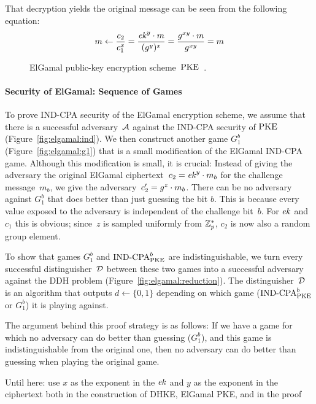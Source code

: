 That decryption yields the original message can be seen from the following equation:
\[m\gets\frac{c_2}{c_1^x}=\frac{\mathit{ek}^y\cdot m}{(g^y)^x}=\frac{g^{xy}\cdot m}{g^{xy}}=m\]
\begin{figure}[!ht]
    \centering
    \nicoresetlinenr%
    \fbox{%
        \scalebox{\codescalefactor}{%
        }%
    }
    \caption{%
        ElGamal public-key encryption scheme~$\mathrm{PKE}$~\cite{ElGamal85}.
    }
    \label{fig:pke:elgamal:const}
\end{figure}

\paragraph{Security of ElGamal: Sequence of Games}
To prove IND-CPA security of the ElGamal encryption scheme, we assume that there is a successful adversary~$\mathcal{A}$ against the IND-CPA security of $\mathrm{PKE}$ (Figure~\ref{fig:elgamal:ind}).
We then construct another game $G_1^b$ (Figure~\ref{fig:elgamal:g1}) that is a small modification of the ElGamal IND-CPA game.
Although this modification is small, it is crucial:
Instead of giving the adversary the original ElGamal ciphertext~$c_2=\mathit{ek}^y\cdot m_b$ for the challenge message~$m_b$, we give the adversary~$c_2'=g^z\cdot m_b$.
There can be no adversary against $G_1^b$ that does better than just guessing the bit $b$.
This is because every value exposed to the adversary is independent of the challenge bit~$b$.
For $\mathit{ek}$ and $c_1$ this is obvious; since~$z$ is sampled uniformly from $\mathbb{Z}_p^*$, $c_2$ is now also a random group element.

To show that games $G_1^b$ and ${\mathrm{IND}\text{-}\mathrm{CPA}}_{\mathrm{PKE}}^b$ are indistinguishable, we turn every successful distinguisher~$\mathcal{D}$ between these two games into a successful adversary against the DDH problem (Figure~\ref{fig:elgamal:reduction}).
The distinguisher~$\mathcal{D}$ is an algorithm that outputs $d\gets\{0,1\}$ depending on which game (${\mathrm{IND}\text{-}\mathrm{CPA}}_{\mathrm{PKE}}^b$ or $G_1^b$) it is playing against.

The argument behind this proof strategy is as follows:
If we have a game for which no adversary can do better than guessing ($G_1^b$), and this game is indistinguishable from the original one, then no adversary can do better than guessing when playing the original game.

\alert{Until here: use $x$ as the exponent in the $\mathit{ek}$ and $y$ as the exponent in the ciphertext both in the construction of DHKE, ElGamal PKE, and in the proof}

